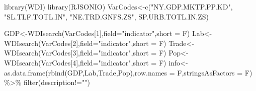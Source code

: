 \documentclass[
  letterpaper,
  DIV=11,
  numbers=noendperiod]{scrartcl}
\newenvironment{Shaded}{\begin{snugshade}}{\end{snugshade}}
\newcommand{\AttributeTok}[1]{\textcolor[rgb]{0.40,0.46,0.14}{#1}}
\newcommand{\DecValTok}[1]{\textcolor[rgb]{0.68,0.00,0.00}{#1}}
\newcommand{\FunctionTok}[1]{\textcolor[rgb]{0.28,0.35,0.67}{#1}}
\newcommand{\NormalTok}[1]{\textcolor[rgb]{0.00,0.46,0.62}{#1}}
\newcommand{\OtherTok}[1]{\textcolor[rgb]{0.00,0.46,0.62}{#1}}
\newcommand{\SpecialCharTok}[1]{\textcolor[rgb]{0.37,0.37,0.37}{#1}}
\newcommand{\StringTok}[1]{\textcolor[rgb]{0.13,0.47,0.30}{#1}}
\begin{document}
\begin{Shaded}
\begin{Highlighting}[]
\FunctionTok{library}\NormalTok{(WDI)}
\FunctionTok{library}\NormalTok{(RJSONIO)}
\NormalTok{VarCodes}\OtherTok{\textless{}{-}}\FunctionTok{c}\NormalTok{(}\StringTok{"NY.GDP.MKTP.PP.KD"}\NormalTok{,}
            \StringTok{"SL.TLF.TOTL.IN"}\NormalTok{,}
            \StringTok{"NE.TRD.GNFS.ZS"}\NormalTok{,}
            \StringTok{\textquotesingle{}SP.URB.TOTL.IN.ZS\textquotesingle{}}\NormalTok{)}

\NormalTok{GDP}\OtherTok{\textless{}{-}}\FunctionTok{WDIsearch}\NormalTok{(VarCodes[}\DecValTok{1}\NormalTok{],}\AttributeTok{field=}\StringTok{"indicator"}\NormalTok{,}\AttributeTok{short =}\NormalTok{ F)}
\NormalTok{Lab}\OtherTok{\textless{}{-}}\FunctionTok{WDIsearch}\NormalTok{(VarCodes[}\DecValTok{2}\NormalTok{],}\AttributeTok{field=}\StringTok{"indicator"}\NormalTok{,}\AttributeTok{short =}\NormalTok{ F)}
\NormalTok{Trade}\OtherTok{\textless{}{-}}\FunctionTok{WDIsearch}\NormalTok{(VarCodes[}\DecValTok{3}\NormalTok{],}\AttributeTok{field=}\StringTok{"indicator"}\NormalTok{,}\AttributeTok{short =}\NormalTok{ F)}
\NormalTok{Pop}\OtherTok{\textless{}{-}}\FunctionTok{WDIsearch}\NormalTok{(VarCodes[}\DecValTok{4}\NormalTok{],}\AttributeTok{field=}\StringTok{"indicator"}\NormalTok{,}\AttributeTok{short =}\NormalTok{ F)}
\NormalTok{info}\OtherTok{\textless{}{-}}\FunctionTok{as.data.frame}\NormalTok{(}\FunctionTok{rbind}\NormalTok{(GDP,Lab,Trade,Pop),}\AttributeTok{row.names =}\NormalTok{ F,}\AttributeTok{stringsAsFactors =}\NormalTok{ F) }\SpecialCharTok{\%\textgreater{}\%} \FunctionTok{filter}\NormalTok{(description}\SpecialCharTok{!=}\StringTok{""}\NormalTok{)}

\end{Highlighting}
\end{Shaded}
\end{document}
